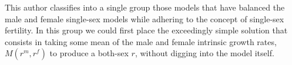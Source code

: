 
This author classifies into a single group those models that have balanced the
male and female single-sex models while adhering to the concept of single-sex
fertility. In this group we could first place the exceedingly simple solution
that consists in taking some mean of the male and female intrinsic growth rates,
$M(r^m, r^f)$ to produce a both-sex $r$, without digging into the model itself.










